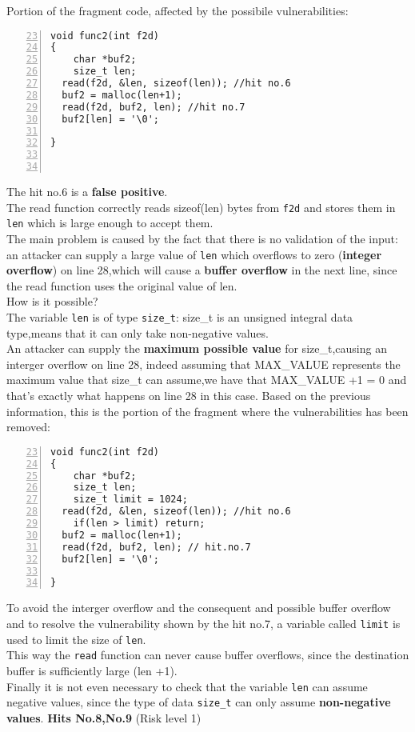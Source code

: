 \documentclass[a4paper,12pt]{article}
\begin{document}
\noindent
Portion of the fragment code, affected by the possibile vulnerabilities:
\begin{lstlisting}[style=c,numbers=left,firstnumber=23,linebackgroundcolor={
\ifnum\value{lstnumber}=27\color{green}\fi
\ifnum\value{lstnumber}=28\color{red}\fi
\ifnum\value{lstnumber}=29\color{red}\fi}]
void func2(int f2d)
{
	char *buf2;
	size_t len;
  read(f2d, &len, sizeof(len)); //hit no.6
  buf2 = malloc(len+1); 
  read(f2d, buf2, len); //hit no.7
  buf2[len] = '\0';

}



\end{lstlisting}
The hit no.6 is a \textbf{false positive}.\\
The read function correctly reads sizeof(len) bytes from \texttt{f2d} and stores them in \texttt{len} which is large enough to accept them.\\
The main problem is caused by the fact that there is no validation of the input: an attacker can supply a large value of \texttt{len} which 
overflows to zero (\textbf{integer overflow}) on line 28,which will cause a \textbf{buffer overflow} in the next line, since the read function uses the original value of len.\\
How is it possible?\\
The variable \texttt{len} is of type \texttt{size\_t}: size\_t is an unsigned integral data type,means that it can only take non-negative values.\\
An attacker can supply the \textbf{maximum possible value} for size\_t,causing an interger overflow on line 28, indeed assuming that MAX\_VALUE represents the maximum value that size\_t can assume,we have that MAX\_VALUE +1 = 0 and that's exactly what happens on line 28 in this case.
\newpage
\noindent
Based on the previous information, this is the portion of the fragment where the vulnerabilities has been removed:
\begin{lstlisting}[style=c,numbers=left,firstnumber=23,linebackgroundcolor={
\ifnum\value{lstnumber}=27\color{green}\fi
\ifnum\value{lstnumber}=28\color{green}\fi
\ifnum\value{lstnumber}=29\color{green}\fi
\ifnum\value{lstnumber}=31\color{green}\fi}]
void func2(int f2d)
{
	char *buf2;
	size_t len;
	size_t limit = 1024;
  read(f2d, &len, sizeof(len)); //hit no.6
	if(len > limit) return;   
  buf2 = malloc(len+1); 
  read(f2d, buf2, len); // hit.no.7
  buf2[len] = '\0';

}
\end{lstlisting}
To avoid the interger overflow and the consequent and possible buffer overflow and to resolve the vulnerability shown by the hit no.7, a variable called \texttt{limit} is used to limit the size of \texttt{len}.\\
This way the \texttt{read} function can never cause buffer overflows, since the destination buffer is sufficiently large (len +1).\\
Finally it is not even necessary to check that the variable \texttt{len} can assume negative values, since the type of data \texttt{size\_t} can only assume \textbf{non-negative values}.
\newpage
\textbf{Hits No.8,No.9} (Risk level 1)
\end{document}
